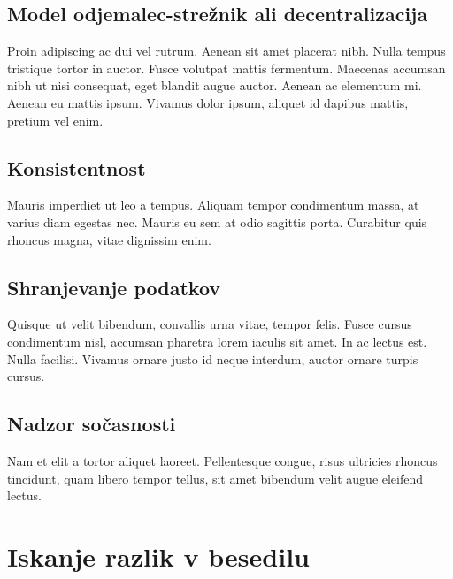 \documentclass[a4paper, 12pt, twoside]{book}
\begin{document}
\section{Model odjemalec-strežnik ali decentralizacija}

Proin adipiscing ac dui vel rutrum. Aenean sit amet placerat nibh. Nulla tempus tristique tortor in auctor. Fusce volutpat mattis fermentum. Maecenas accumsan nibh ut nisi consequat, eget blandit augue auctor. Aenean ac elementum mi. Aenean eu mattis ipsum. Vivamus dolor ipsum, aliquet id dapibus mattis, pretium vel enim.

\section{Konsistentnost}

Mauris imperdiet ut leo a tempus. Aliquam tempor condimentum massa, at varius diam egestas nec. Mauris eu sem at odio sagittis porta. Curabitur quis rhoncus magna, vitae dignissim enim.

\section{Shranjevanje podatkov}

Quisque ut velit bibendum, convallis urna vitae, tempor felis. Fusce cursus condimentum nisl, accumsan pharetra lorem iaculis sit amet. In ac lectus est. Nulla facilisi. Vivamus ornare justo id neque interdum, auctor ornare turpis cursus.

\section{Nadzor sočasnosti}

Nam et elit a tortor aliquet laoreet. Pellentesque congue, risus ultricies rhoncus tincidunt, quam libero tempor tellus, sit amet bibendum velit augue eleifend lectus.

\chapter{Iskanje razlik v besedilu}
\label{chp:diff}
\end{document}
